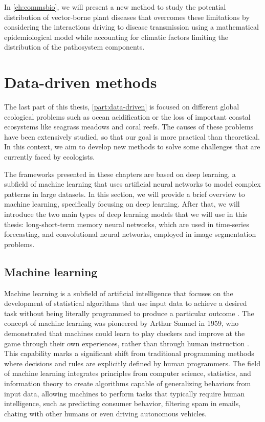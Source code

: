 In \cref{ch:commsbio}, we will present a new method to study the potential
distribution of vector-borne plant diseases that overcomes these limitations by
considering the interactions driving to disease transmission using a
mathematical epidemiological model while accounting for climatic factors
limiting the distribution of the pathosystem components.

\section{\label{sec:Data-driven methods} Data-driven methods}

The last part of this thesis, \cref{part:data-driven} is focused on different
global ecological problems such as ocean acidification or the loss of important
coastal ecosystems like seagrass meadows and coral reefs. The causes of
these problems have been extensively studied, so that our goal is more
practical than theoretical. In this context, we aim to develop new methods to
solve some challenges that are currently faced by ecologists.

The frameworks presented in these chapters are based on deep learning, a
subfield of machine learning that uses artificial neural networks to model
complex patterns in large datasets. In this section, we will provide a brief
overview to machine learning, specifically focusing on deep learning. After
that, we will introduce the two main types of deep learning models that we will
use in this thesis: long-short-term memory neural networks, which are used in
time-series forecasting, and convolutional neural networks, employed in image
segmentation problems.

\subsection{\label{sec:Machine learning} Machine learning}

Machine learning is a subfield of artificial intelligence that focuses on the
development of statistical algorithms that use input data to achieve a desired
task without being literally programmed to produce a particular outcome
\cite{Michalski2013,ElNaqa2015}. The concept of machine learning was pioneered
by Arthur Samuel in 1959, who demonstrated that machines could learn to play
checkers and improve at the game through their own experiences, rather than
through human instruction \cite{Samuel2000}. This capability marks a
significant shift from traditional programming methods where decisions and
rules are explicitly defined by human programmers. The field of machine
learning integrates principles from computer science, statistics, and
information theory to create algorithms capable of generalizing behaviors from
input data, allowing machines to perform tasks that typically require human
intelligence, such as predicting consumer behavior, filtering spam in emails,
chating with other humans or even driving autonomous vehicles.

